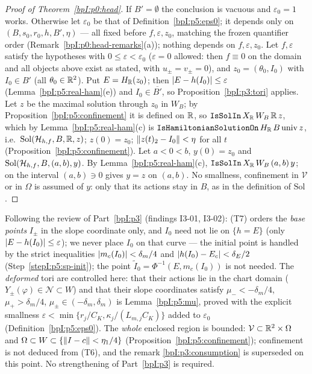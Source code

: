 \begin{proof}[Proof of Theorem~\ref{bpI:p0:head}]
\label{stepI:p5:hd-eps} If $B'=\emptyset$ the conclusion is vacuous and $\varepsilon_0=1$ works. Otherwise let $\varepsilon_0$ be that of Definition~\ref{bpI:p5:eps0}; it depends only on $(B,s_0,r_0,h,B',\eta)$ --- all fixed before $f,\varepsilon,z_0$, matching the frozen quantifier order (Remark~\ref{bpI:p0:head-remarks}(a)); nothing depends on $f,\varepsilon,z_0$.
\label{stepI:p5:hd-fix} Let $f,\varepsilon$ satisfy the hypotheses with $0\le\varepsilon<\varepsilon_0$ ($\varepsilon=0$ allowed: then $f\equiv0$ on the domain and all objects above exist as stated, with $u_\pm=v_\pm=0$), and $z_0=(\theta_0,I_0)$ with $I_0\in B'$ (all $\theta_0\in\mathbb{R}^2$). Put $E=H_{\mathbb{R}}(z_0)$; then $\lvert E-h(I_0)\rvert\le\varepsilon$ (Lemma~\ref{bpI:p5:real-ham}(e)) and $I_0\in\overline{B'}$, so Proposition~\ref{bpI:p3:tori} applies.
\label{stepI:p5:hd-sol} Let $z$ be the maximal solution through $z_0$ in $W_B$; by Proposition~\ref{bpI:p5:confinement} it is defined on $\mathbb{R}$, so $\texttt{IsSolIn}\,X_{\mathbb{R}}\,W_B\,\mathbb{R}\,z$, which by Lemma~\ref{bpI:p5:real-ham}(c) is $\texttt{IsHamiltonianSolutionOn}\,H_{\mathbb{R}}\,B\,\mathrm{univ}\,z$, i.e.\ $\mathrm{Sol}(\mathcal H_{h,f},B,\mathbb{R},z)$; $z(0)=z_0$; $\lVert z(t)_2-I_0\rVert<\eta$ for all $t$ (Proposition~\ref{bpI:p5:confinement}).
\label{stepI:p5:hd-uniq} Let $a<0<b$, $y(0)=z_0$ and $\mathrm{Sol}(\mathcal H_{h,f},B,(a,b),y)$. By Lemma~\ref{bpI:p5:real-ham}(c), $\texttt{IsSolIn}\,X_{\mathbb{R}}\,W_B\,(a,b)\,y$;  on the interval $(a,b)\ni0$ gives $y=z$ on $(a,b)$. No smallness, confinement in $\mathcal V$ or in $\Omega$ is assumed of $y$: only that its actions stay in $B$, as in the definition of $\mathrm{Sol}$.
\end{proof}

\begin{remark}\label{bpI:p5:p3-gap}
Following the review of Part~\ref{bpI:p3} (findings I3-01, I3-02): (T7) orders the \emph{base points} $I_\pm$ in the slope coordinate only, and $I_0$ need not lie on $\{h=E\}$ (only $\lvert E-h(I_0)\rvert\le\varepsilon$);
we never place $I_0$ on that curve --- the initial point is handled by the strict inequalities $\lvert m_c(I_0)\rvert<\delta_m/4$ and $\lvert h(I_0)-E_c\rvert<\delta_E/2$ (Step~\ref{stepI:p5:sp-init}); the point $\tilde I_0=\Phi^{-1}(E,m_c(I_0))$ is not needed.
The \emph{deformed} tori are controlled here: that their actions lie in the chart domain ($Y_\pm(\varphi)\in\mathcal N\subset W$) and that their slope coordinates satisfy $\mu_-<-\delta_m/4$, $\mu_+>\delta_m/4$, $\mu_\pm\in(-\delta_m,\delta_m)$ is Lemma~\ref{bpI:p5:mu}, proved with the explicit smallness
$\varepsilon<\min\{r_j/C_K,\kappa_j/(L_{m,j}C_K)\}$ added to $\varepsilon_0$ (Definition~\ref{bpI:p5:eps0}). The \emph{whole} enclosed region is bounded: $\mathcal V\subset\mathbb{R}^2\times\Omega$ and $\Omega\subset W\subset\{\lVert I-c\rVert<\eta_1/4\}$ (Proposition~\ref{bpI:p5:confinement}); confinement is not deduced from (T6), and the remark \ref{bpI:p3:consumption} is superseded on this point. No strengthening of Part~\ref{bpI:p3} is required.
\end{remark}

